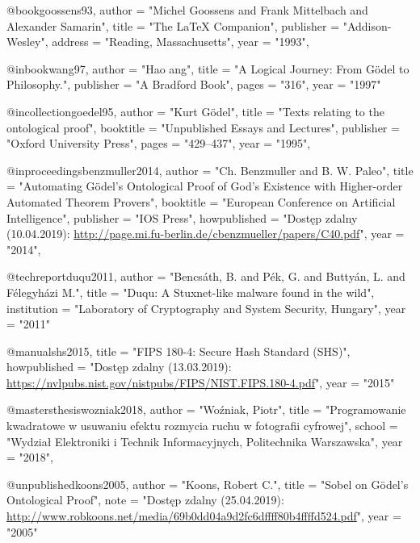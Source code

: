 @book{goossens93,
    author    = "Michel Goossens and Frank Mittelbach and Alexander Samarin",
    title     = "The LaTeX Companion",
    publisher = "Addison-Wesley",
    address   = "Reading, Massachusetts",
    year      = "1993",
}

@inbook{wang97,
    author      = "Hao ang",
    title       = "A Logical Journey: From G{\"o}del to Philosophy.",
    publisher   = "A Bradford Book",
    pages       = "316",
    year        = "1997"
}

@incollection{goedel95,
    author      = "Kurt G{\"o}del",
    title       = "Texts relating to the ontological proof",
    booktitle   = "Unpublished Essays and Lectures",
    publisher   = "Oxford University Press",
    pages       = "429--437",
    year        = "1995",
}

@inproceedings{benzmuller2014,
    author       = "{Ch}. Benzmuller and B. W. Paleo",
    title        = "Automating {G\"o}del’s {O}ntological {P}roof of {G}od’s {E}xistence with {H}igher-order {A}utomated {T}heorem {P}rovers",
    booktitle    = "European	Conference on Artificial Intelligence",
    publisher    = "IOS Press",
    howpublished = "Dostęp zdalny (10.04.2019): \url{http://page.mi.fu-berlin.de/cbenzmueller/papers/C40.pdf}",
    year         = "2014",
}

@techreport{duqu2011,
    author      = "Bencsáth, B. and Pék, G. and Buttyán, L. and Félegyházi M.",
    title       = "{D}uqu: {A} {S}tuxnet-like malware found in the wild",
    institution = "Laboratory of Cryptography and System Security, Hungary",
    year        = "2011"
}

@manual{shs2015,
    title        = "{FIPS} 180-4: {S}ecure {H}ash {S}tandard ({SHS})",
    howpublished = "Dostęp zdalny (13.03.2019): \url{https://nvlpubs.nist.gov/nistpubs/FIPS/NIST.FIPS.180-4.pdf}",
    year         = "2015"
}

@mastersthesis{wozniak2018,
    author = "Woźniak, Piotr",
    title  = "{P}rogramowanie kwadratowe w usuwaniu efektu rozmycia ruchu w fotografii cyfrowej",
    school  = "Wydział Elektroniki i Technik Informacyjnych, Politechnika Warszawska",
    year   = "2018",
}

@unpublished{koons2005,
    author = "Koons, Robert C.",
    title  = "{S}obel on {G\"o}del’s {O}ntological {P}roof",
    note   = "Dostęp zdalny (25.04.2019): \url{http://www.robkoons.net/media/69b0dd04a9d2fc6dffff80b4ffffd524.pdf}",
    year   = "2005"
}
